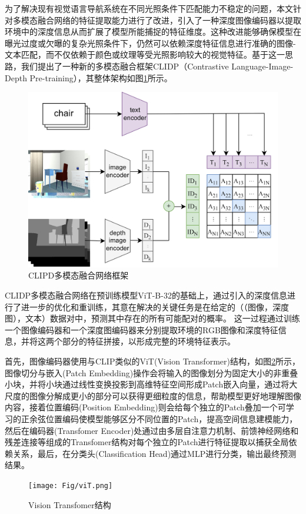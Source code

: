 为了解决现有视觉语言导航系统在不同光照条件下匹配能力不稳定的问题，本文针对多模态融合网络的特征提取能力进行了改进，引入了一种深度图像编码器以提取环境中的深度信息从而扩展了模型所能捕捉的特征维度。这种改进能够确保模型在曝光过度或欠曝的复杂光照条件下，仍然可以依赖深度特征信息进行准确的图像-文本匹配，而不仅依赖于颜色或纹理等受光照影响较大的视觉特征。基于这一思路，我们提出了一种新的多模态融合框架CLIDP（Contrastive Language-Image-Depth Pre-training），其整体架构如图\ref{CLIPD_framework}所示。
\begin{figure}[htbp]
    \centering
    \includegraphics[scale=0.09]{Fig/CLIPD_framework.png}
    \caption{\label{CLIPD_framework}CLIPD多模态融合网络框架}
\end{figure}

CLIDP多模态融合网络在预训练模型ViT-B-32\cite{radford2021learning}的基础上，通过引入的深度信息进行了进一步的优化和重训练，其意在解决的关键任务是在给定的（（图像，深度图），文本）数据对中，预测其中存在的所有可能配对的概率。
这一过程通过训练一个图像编码器和一个深度图编码器来分别提取环境的RGB图像和深度特征信息，并将这两个部分的特征拼接，以形成完整的环境特征表示。

首先，图像编码器使用与CLIP类似的ViT(Vision Transformer)结构，如图\ref{viT}所示，图像切分与嵌入(Patch Embedding)操作会将输入的图像划分为固定大小的非重叠小块，并将小块通过线性变换投影到高维特征空间形成Patch嵌入向量，通过将大尺度的图像分解成更小的部分可以获得更细粒度的信息，帮助模型更好地理解图像内容，接着位置编码(Position Embedding)则会给每个独立的Patch叠加一个可学习的正余弦位置编码使模型能够区分不同位置的Patch，提高空间信息建模能力，然后在编码器(Transfomer Encoder)处通过由多层自注意力机制、前馈神经网络和残差连接等组成的Transfomer结构对每个独立的Patch进行特征提取以捕获全局依赖关系，最后，在分类头(Classification Head)通过MLP进行分类，输出最终预测结果。
\begin{figure}[htbp]
    \centering
    \texttt{[image: Fig/viT.png]}
    \caption{\label{viT}Vision Transfomer结构}
\end{figure}

